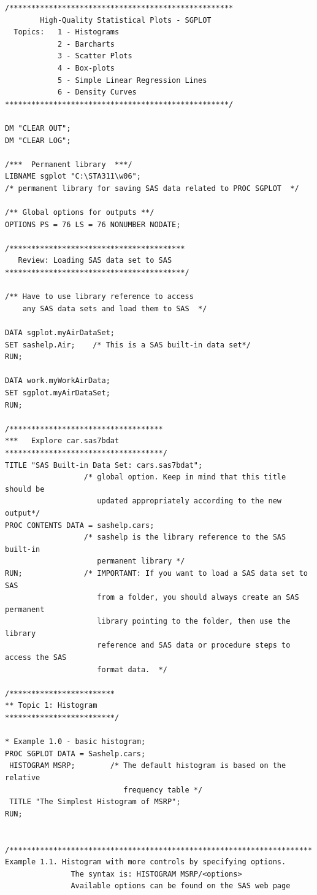 \documentclass[
]{book}
\begin{document}
\begin{verbatim}
/***************************************************
        High-Quality Statistical Plots - SGPLOT
  Topics:   1 - Histograms
            2 - Barcharts
            3 - Scatter Plots          
            4 - Box-plots
            5 - Simple Linear Regression Lines
            6 - Density Curves
***************************************************/

DM "CLEAR OUT";
DM "CLEAR LOG";

/***  Permanent library  ***/
LIBNAME sgplot "C:\STA311\w06";   
/* permanent library for saving SAS data related to PROC SGPLOT  */

/** Global options for outputs **/
OPTIONS PS = 76 LS = 76 NONUMBER NODATE;

/****************************************
   Review: Loading SAS data set to SAS
*****************************************/

/** Have to use library reference to access
    any SAS data sets and load them to SAS  */

DATA sgplot.myAirDataSet;
SET sashelp.Air;    /* This is a SAS built-in data set*/
RUN;

DATA work.myWorkAirData;
SET sgplot.myAirDataSet;
RUN;

/***********************************
***   Explore car.sas7bdat
************************************/
TITLE "SAS Built-in Data Set: cars.sas7bdat";   
                  /* global option. Keep in mind that this title should be 
                     updated appropriately according to the new output*/
PROC CONTENTS DATA = sashelp.cars;     
                  /* sashelp is the library reference to the SAS built-in 
                     permanent library */
RUN;              /* IMPORTANT: If you want to load a SAS data set to SAS 
                     from a folder, you should always create an SAS permanent 
                     library pointing to the folder, then use the library 
                     reference and SAS data or procedure steps to access the SAS
                     format data.  */

/************************
** Topic 1: Histogram
*************************/

* Example 1.0 - basic histogram;
PROC SGPLOT DATA = Sashelp.cars;
 HISTOGRAM MSRP;        /* The default histogram is based on the relative 
                           frequency table */
 TITLE "The Simplest Histogram of MSRP";
RUN; 


/********************************************************************* 
Example 1.1. Histogram with more controls by specifying options.
               The syntax is: HISTOGRAM MSRP/<options>
               Available options can be found on the SAS web page


\end{verbatim}
\end{document}
